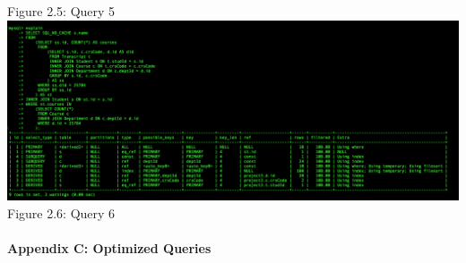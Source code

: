 \documentclass[11pt]{report}
\begin{document}
\begin{center}
			Figure 2.5: Query 5\\
			\includegraphics[scale=0.336]{Eb6.PNG}\\
			Figure 2.6: Query 6\\
		\end{center}
	\paragraph*{Appendix C: Optimized Queries}
\end{document}
